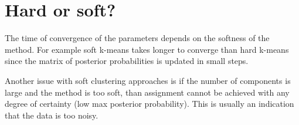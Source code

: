 \section{Hard or soft?}

The time of convergence of the parameters depends on the softness of the method.
For example soft k-means takes longer to converge than hard k-means since the matrix of posterior probabilities is updated in small steps.

Another issue with soft clustering approaches is if the number of components is large and the method is too soft, than assignment cannot be achieved with
any degree of certainty (low max posterior probability).
This is usually an indication that the data is too noisy.



%


